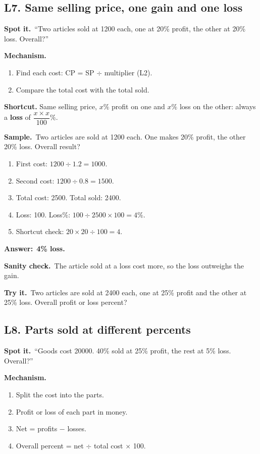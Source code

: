 \documentclass[11pt,a4paper]{article}
\let\oldsubsection\subsection
\renewcommand{\subsection}{\needspace{9\baselineskip}\oldsubsection}
\newcommand{\spot}{\textbf{\color{ember}Spot it.}\ }
\newcommand{\mech}{\textbf{\color{ember}Mechanism.}\ }
\newif\ifkeepsamp
\newcommand{\ans}[1]{\par\nopagebreak\noindent\textbf{\color{ember}Answer:}\ \textbf{#1}\par}
\newcommand{\samp}{\ifkeepsamp\needspace{4\baselineskip}\fi\textbf{\color{ember}Sample.}\ }
\newcommand{\sane}{\textbf{\color{slate}Sanity check.}\ }
\newcommand{\tryit}[1]{\textbf{\color{ember}Try it.}\ #1}
\begin{document}
\subsection{L7. Same selling price, one gain and one loss}
\spot ``Two articles sold at 1200 each, one at 20\% profit, the other at 20\% loss. Overall?''

\mech
\begin{enumerate}
\item Find each cost: CP = SP $\div$ multiplier (L2).
\item Compare the total cost with the total sold.
\end{enumerate}
\textbf{Shortcut.} Same selling price, $x\%$ profit on one and $x\%$ loss on the other: always a \textbf{loss} of $\dfrac{x \times x}{100}\%$.

\samp Two articles are sold at 1200 each. One makes 20\% profit, the other 20\% loss. Overall result?
\begin{enumerate}
\item First cost: $1200 \div 1.2 = 1000$.
\item Second cost: $1200 \div 0.8 = 1500$.
\item Total cost: 2500. Total sold: 2400.
\item Loss: 100. Loss\%: $100 \div 2500 \times 100 = 4\%$.
\item Shortcut check: $20 \times 20 \div 100 = 4$.
\end{enumerate}
\ans{4\% loss.}

\sane The article sold at a loss cost more, so the loss outweighs the gain.

\tryit Two articles are sold at 2400 each, one at 25\% profit and the other at 25\% loss. Overall profit or loss percent?

\subsection{L8. Parts sold at different percents}
\spot ``Goods cost 20000. 40\% sold at 25\% profit, the rest at 5\% loss. Overall?''

\mech
\begin{enumerate}
\item Split the cost into the parts.
\item Profit or loss of each part in money.
\item Net = profits $-$ losses.
\item Overall percent = net $\div$ total cost $\times$ 100.
\end{enumerate}
\end{document}
